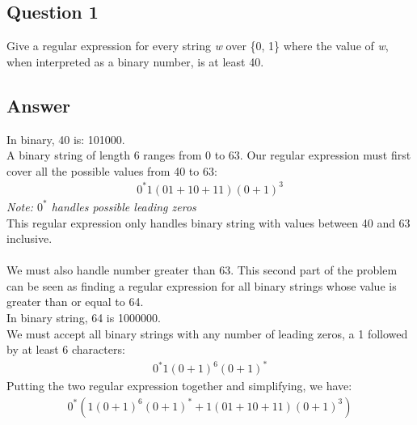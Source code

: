 \newpage
\subsection*{Question 1}
\noindent [5 pts] Give a regular expression for every string \emph{w} over \{0, 1\} where the value of \emph{w}, when interpreted as a binary number, is at least 40.

\subsection*{Answer}

\noindent In binary, 40 is: 101000.\\
\noindent A binary string of length 6 ranges from 0 to 63. Our regular expression must first cover all the possible values from 40 to 63:
\begin{align*}
    0^*1(01 + 10 + 11)(0 + 1)^3
\end{align*}
\emph{Note: $0^*$ handles possible leading zeros}\\
\noindent This regular expression only handles binary string with values between 40 and 63 inclusive.\\\\
\noindent We must also handle number greater than 63. This second part of the problem can be seen as finding 
a regular expression for all binary strings whose value is greater than or equal to 64.\\
In binary string, 64 is 1000000.\\
\noindent We must accept all binary strings with any number of leading zeros, a 1 followed by at least 6 characters:
\begin{align*}
    0^*1(0 + 1)^6(0 + 1)^*
\end{align*}
\noindent Putting the two regular expression together and simplifying, we have:
\begin{align*}
    0^*(1(0 + 1)^6(0 + 1)^* + 1(01 + 10 + 11)(0 + 1)^3)
\end{align*}

